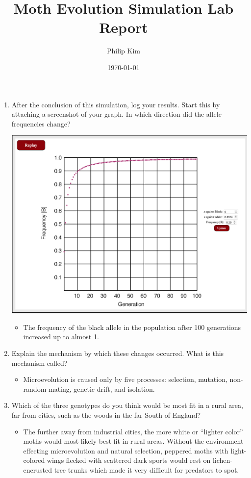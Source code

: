 \documentclass{article}
\title{Moth Evolution Simulation Lab Report}
\author{Philip Kim}
\date{\today}
\begin{document}
\maketitle
\begin{enumerate}
  \item After the conclusion of this simulation, log your results. Start this by attaching a screenshot of your graph. In which direction did the allele frequencies change?
  \begin{center}
    \includegraphics[scale=0.3]{white.png}
  \end{center}
  \begin{itemize}
    \item The frequency of the black allele in the population after 100 generations increased up to almost 1.
  \end{itemize}
  \item Explain the mechanism by which these changes occurred. What is this mechanism called?
  \begin{itemize}
    \item Microevolution is caused only by five processes: selection, mutation, non-random mating, genetic drift, and isolation.
  \end{itemize}
  \item Which of the three genotypes do you think would be most fit in a rural area, far from cities, such as the woods in the far South of England?
  \begin{itemize}
    \item The further away from industrial cities, the more white or ``lighter color'' moths would most likely best fit in rural areas. Without the environment effecting microevolution and natural selection, peppered moths with light-colored wings flecked with scattered dark sports would rest on lichen-encrusted tree trunks which made it very difficult for predators to spot.

\end{itemize}
\end{enumerate}
\end{document}
